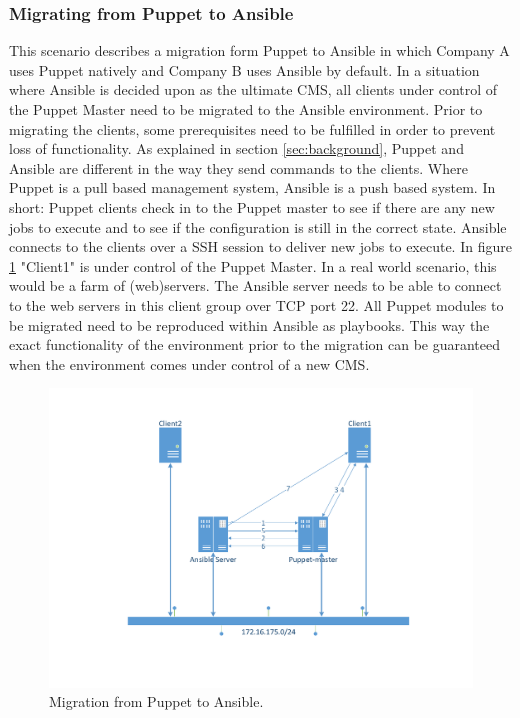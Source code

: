 \subsubsection{Migrating from Puppet to Ansible}\label{subsec:Puppettoansible}
This scenario describes a migration form Puppet to Ansible in which Company A uses Puppet natively and Company B uses Ansible by default. In a situation where Ansible is decided upon as the ultimate CMS, all clients under control of the Puppet Master need to be migrated to the Ansible environment. Prior to migrating the clients, some prerequisites need to be fulfilled in order to prevent loss of functionality. As explained in section \ref{sec:background}, Puppet and Ansible are different in the way they send commands to the clients. Where Puppet is a pull based management system, Ansible is a push based system. In short: Puppet clients check in to the Puppet master to see if there are any new jobs to execute and to see if the configuration is still in the correct state. Ansible connects to the clients over a SSH session to deliver new jobs to execute. In figure \ref{fig:situation1} "Client1" is under control of the Puppet Master. In a real world scenario, this would be a farm of (web)servers. The Ansible server needs to be able to connect to the web servers in this client group over TCP port 22. All Puppet modules to be migrated need to be reproduced within Ansible as playbooks. This way the exact functionality of the environment prior to the migration can be guaranteed when the environment comes under control of a new CMS.

\begin{figure}[!ht]
        \includegraphics[scale=0.5]{img/PuppettoAnsible.pdf}     
        \caption{Migration from Puppet to Ansible.}
        \label{fig:situation1}
\end{figure}

